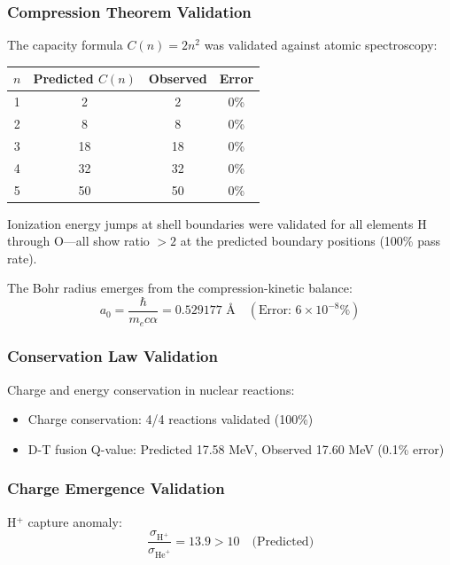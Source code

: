 \documentclass[twocolumn,10pt,a4paper]{article}
\theoremstyle{definition}
\theoremstyle{remark}
\begin{document}
\subsubsection{Compression Theorem Validation}

The capacity formula $C(n) = 2n^2$ was validated against atomic spectroscopy:

\begin{center}
\begin{tabular}{cccc}
\toprule
$n$ & Predicted $C(n)$ & Observed & Error \\
\midrule
1 & 2 & 2 & 0\% \\
2 & 8 & 8 & 0\% \\
3 & 18 & 18 & 0\% \\
4 & 32 & 32 & 0\% \\
5 & 50 & 50 & 0\% \\
\bottomrule
\end{tabular}
\end{center}

Ionization energy jumps at shell boundaries were validated for all elements H through O---all show ratio $>2$ at the predicted boundary positions (100\% pass rate).

The Bohr radius emerges from the compression-kinetic balance:
\begin{equation}
    a_0 = \frac{\hbar}{m_e c \alpha} = 0.529177 \text{ \AA} \quad (\text{Error: } 6 \times 10^{-8}\%)
\end{equation}

\subsubsection{Conservation Law Validation}

Charge and energy conservation in nuclear reactions:
\begin{itemize}
    \item Charge conservation: 4/4 reactions validated (100\%)
    \item D-T fusion Q-value: Predicted 17.58 MeV, Observed 17.60 MeV (0.1\% error)
\end{itemize}

\subsubsection{Charge Emergence Validation}

H$^+$ capture anomaly:
\begin{equation}
    \frac{\sigma_{\text{H}^+}}{\sigma_{\text{He}^+}} = 13.9 > 10 \quad \text{(Predicted)}
\end{equation}
\end{document}
